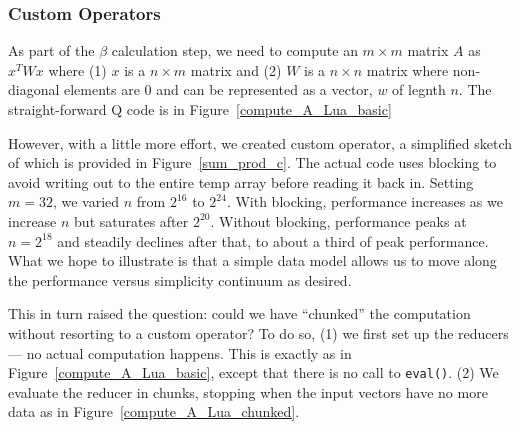 \subsubsection{Custom Operators}

As part of the \(\beta\) calculation step, we need to compute an \(m \times m\)
matrix \(A\) as  \(x^T W x\) where (1) 
\(x\) is a \(n \times m\) matrix and (2) \(W\) is a \(n \times n\) matrix where
non-diagonal elements are 0 and can be represented as a vector, \(w\) of legnth
\(n\). 
The straight-forward Q code is in Figure~\ref{compute_A_Lua_basic}
\begin{figure}
\centering
{}
\end{figure}

However, with a little more effort, we created custom operator, 
a simplified sketch of which is provided in Figure~\ref{sum_prod_c}. The actual code
uses blocking to avoid writing out to the entire temp array before reading it
back in. Setting \(m=32\), we varied \(n\) from \(2^{16}\) to \(2^{24}\). With
blocking, performance increases as we increase \(n\) but saturates after
\(2^{20}\). Without blocking, performance peaks at \(n=2^{18}\) and steadily
declines after that, to about a third of peak performance.
What we hope to illustrate is that a
simple data model allows us to move along the performance versus simplicity
continuum as desired.

\begin{figure}
\centering
{}
\end{figure}

This in turn raised the question: could we have ``chunked'' the computation 
without resorting to a custom operator? To do so, (1)
we first set up the reducers --- no actual
computation happens. This is exactly as in Figure~\ref{compute_A_Lua_basic}, except that there is no call to
{\tt eval()}. (2) We evaluate the reducer in chunks, stopping
when the input vectors have no more data as in
Figure~\ref{compute_A_Lua_chunked}.
\begin{figure}
\centering
{}
\end{figure}

